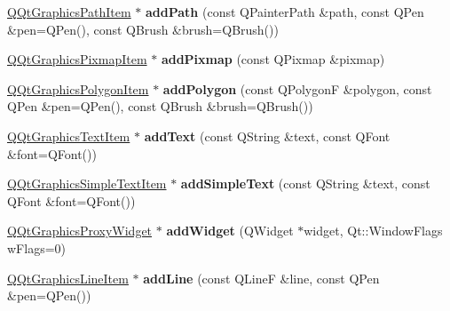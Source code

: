 \begin{DoxyCompactItemize}
\item 
\mbox{\label{class_q_qt_graphics_scene_a13e2c8a48bee8891f17fd77003aff382}} 
\mbox{\hyperlink{class_q_qt_graphics_path_item}{Q\+Qt\+Graphics\+Path\+Item}} $\ast$ {\bfseries add\+Path} (const Q\+Painter\+Path \&path, const Q\+Pen \&pen=Q\+Pen(), const Q\+Brush \&brush=Q\+Brush())
\item 
\mbox{\label{class_q_qt_graphics_scene_a66099c4edf2b588a2e570e3a17b6667d}} 
\mbox{\hyperlink{class_q_qt_graphics_pixmap_item}{Q\+Qt\+Graphics\+Pixmap\+Item}} $\ast$ {\bfseries add\+Pixmap} (const Q\+Pixmap \&pixmap)
\item 
\mbox{\label{class_q_qt_graphics_scene_ae9461c068c9f8090196a1cceb4fc0105}} 
\mbox{\hyperlink{class_q_qt_graphics_polygon_item}{Q\+Qt\+Graphics\+Polygon\+Item}} $\ast$ {\bfseries add\+Polygon} (const Q\+PolygonF \&polygon, const Q\+Pen \&pen=Q\+Pen(), const Q\+Brush \&brush=Q\+Brush())
\item 
\mbox{\label{class_q_qt_graphics_scene_a40b9db781ce7aa26e345b44f04ac4e4c}} 
\mbox{\hyperlink{class_q_qt_graphics_text_item}{Q\+Qt\+Graphics\+Text\+Item}} $\ast$ {\bfseries add\+Text} (const Q\+String \&text, const Q\+Font \&font=Q\+Font())
\item 
\mbox{\label{class_q_qt_graphics_scene_a932b99b2c8bfae51ef5ee7db8287fb54}} 
\mbox{\hyperlink{class_q_qt_graphics_simple_text_item}{Q\+Qt\+Graphics\+Simple\+Text\+Item}} $\ast$ {\bfseries add\+Simple\+Text} (const Q\+String \&text, const Q\+Font \&font=Q\+Font())
\item 
\mbox{\label{class_q_qt_graphics_scene_a033e4a92cda9223dc579b3001d96136f}} 
\mbox{\hyperlink{class_q_qt_graphics_proxy_widget}{Q\+Qt\+Graphics\+Proxy\+Widget}} $\ast$ {\bfseries add\+Widget} (Q\+Widget $\ast$widget, Qt\+::\+Window\+Flags w\+Flags=0)
\item 
\mbox{\label{class_q_qt_graphics_scene_a388011e60e26230e0892b64c7b704eef}} 
\mbox{\hyperlink{class_q_qt_graphics_line_item}{Q\+Qt\+Graphics\+Line\+Item}} $\ast$ {\bfseries add\+Line} (const Q\+LineF \&line, const Q\+Pen \&pen=Q\+Pen())

\end{DoxyCompactItemize}
